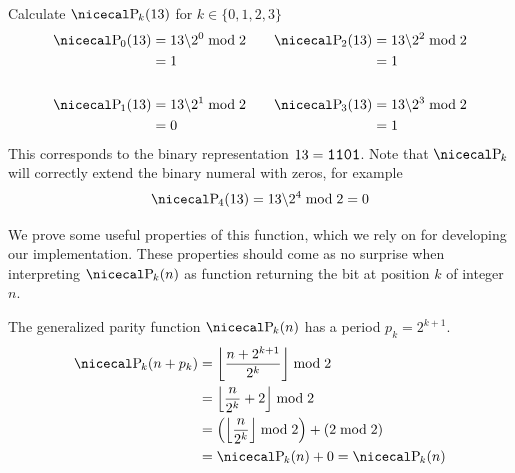 \documentclass[a4paper,11pt, oneside]{report}
\begin{document}
\example Calculate $\parity_k(13)$ for $k\in\{0,1,2,3\}$
\begin{align*}
\parity_0(13) &= 13 \backslash 2^0 \bmod 2 & \quad\parity_2(13) &= 13 \backslash 2^2 \bmod 2  \\
     &= 1                                               &&=1 \\
     &&&\\
\parity_1(13)
     &= 13 \backslash 2^1 \bmod 2 &\quad\parity_3(13) &= 13 \backslash 2^3 \bmod 2 \\
      &= 0                                           &&= 1
\end{align*}
This corresponds to the binary representation $13 = \bin{1101}$. Note that $\parity_k$ will correctly extend the binary numeral with zeros, for example $$\parity_4(13) = {13 \backslash 2^4} \bmod 2 =0$$


We prove some useful properties of this function, which we rely on for developing our implementation. These properties should come as no surprise when interpreting $\parity_k(n)$ as function returning the bit  at position $k$ of integer $n$.

\lemma The generalized parity function $\parity_k(n)$ has a period $p_k = 2^{k+1}$.
\begin{equation*}
\begin{split}
\parity_k(n + p_k)
    &= \floor{{n + 2^{k+1} \over 2^k}} \bmod 2 \\
    &= \floor{{n \over 2^k} + 2} \bmod 2 \\
    &= \left(\floor{{n \over 2^k}} \bmod 2\right) + (2 \bmod 2) \\
    &= \parity_k(n) + 0 = \parity_k(n)
\end{split}
\end{equation*}
\end{document}
